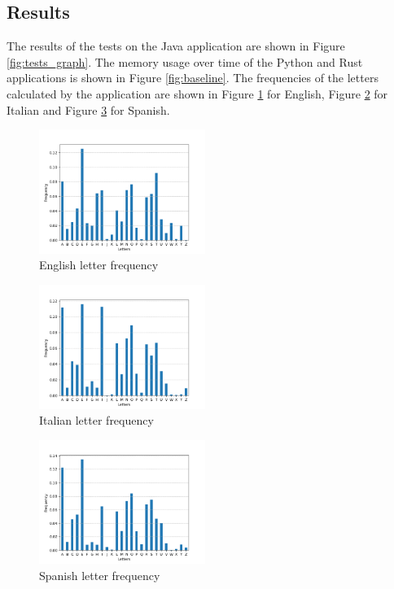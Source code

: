 \documentclass{article}
\begin{document}
\begin{multicols}{2}
\section{Results}
    The results of the tests on the Java application are shown in Figure \ref{fig:tests_graph}.
    The memory usage over time of the Python and Rust applications is shown in Figure \ref{fig:baseline}.
    The frequencies of the letters calculated by the application are shown in 
    Figure \ref{fig:en_freq} for English, Figure \ref{fig:it_freq} for Italian and 
    Figure \ref{fig:es_freq} for Spanish.
    \begin{figure}[H]
        \centering
        \includegraphics[width=0.48\textwidth]{figures/en.png}
        \caption{English letter frequency}
        \label{fig:en_freq}
    \end{figure}
    \begin{figure}[H]
        \centering
        \includegraphics[width=0.48\textwidth]{figures/it.png}
        \caption{Italian letter frequency}
        \label{fig:it_freq}
    \end{figure}
    \begin{figure}[H]
        \centering
        \includegraphics[width=0.48\textwidth]{figures/es.png}
        \caption{Spanish letter frequency}
        \label{fig:es_freq}
    \end{figure}

\end{multicols}
\end{document}
